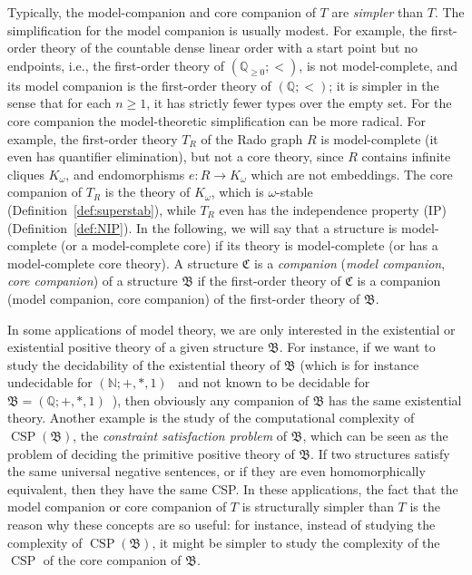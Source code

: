\documentclass{amsart}
\theoremstyle{definition}
\theoremstyle{remark}
\numberwithin{equation}{section}
\newcommand{\csp}{\operatorname{CSP}}
\newcommand{\bB}{\mathfrak{B}}
\newcommand{\bC}{\mathfrak{C}}
\begin{document}
Typically, the model-companion and core companion of $T$ are \emph{simpler} than $T$. The simplification for the model companion is usually modest. 
For example, the first-order theory of the countable dense linear order with a start point but no endpoints, i.e., the first-order theory of $({\mathbb Q}_{\geq 0};<)$, is not model-complete, and its model companion is the first-order theory of $({\mathbb Q};<)$; it is simpler in the sense that for each $n \geq 1$, it has strictly fewer types over the empty set. For the core companion the model-theoretic simplification can be more radical. For example, the first-order theory $T_R$ of the Rado graph $R$ is model-complete (it even has quantifier elimination), but not a core theory, since $R$ contains infinite cliques $K_{\omega}$, and endomorphisms $e \colon R \to K_\omega$ which are not embeddings. 
The core companion of $T_R$ is the theory of $K_{\omega}$, which is $\omega$-stable (Definition~\ref{def:superstab}), while $T_R$ even has the independence property (IP) (Definition~\ref{def:NIP}).
In the following, we will say that a structure is model-complete (or a model-complete core) if its theory is model-complete (or has a model-complete core theory). 
A structure $\bC$ is a \emph{companion} (\emph{model companion}, 
\emph{core companion}) of a structure $\bB$ if the first-order theory of $\bC$ is a companion (model companion, 
core companion) of the first-order theory of $\bB$. 


In some applications of model theory, we are only interested in the existential or existential positive theory of a given structure $\bB$. For instance, 
if we want to study the decidability of the existential theory of $\bB$ (which is for instance undecidable for $({\mathbb N};+,*,1)$~\cite{MatiyasevichDoklady} and not known to be decidable for $\bB = ({\mathbb Q};+,*,1)$~\cite{Anscombe2024}), then obviously any companion of 
$\bB$ has the same existential theory. Another example  
is the study of the computational complexity of $\csp(\bB)$, the \emph{constraint satisfaction problem} of $\bB$, which can be seen as the problem of deciding the primitive positive theory of $\bB$. If two structures satisfy the same universal negative sentences, or if they are even homomorphically equivalent, then they have the same CSP. 
In these applications, 
the fact that the model companion or core companion of $T$ is structurally simpler than $T$ is the reason why these concepts are so useful: 
for instance, instead of studying the complexity of $\csp(\bB)$, it might be simpler to study the complexity of the $\csp$ of the core companion of $\bB$. 
\end{document}
